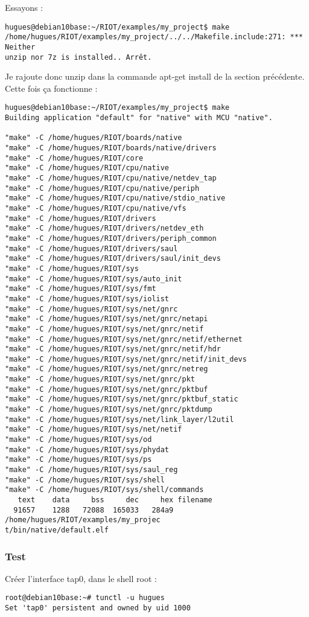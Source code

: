 Essayons :
\begin{verbatim}
hugues@debian10base:~/RIOT/examples/my_project$ make
/home/hugues/RIOT/examples/my_project/../../Makefile.include:271: *** Neither
unzip nor 7z is installed.. Arrêt.
\end{verbatim}
Je rajoute donc unzip dans la commande apt-get install de la section précédente.\\

Cette fois ça fonctionne :
\begin{verbatim}
hugues@debian10base:~/RIOT/examples/my_project$ make
Building application "default" for "native" with MCU "native".

"make" -C /home/hugues/RIOT/boards/native
"make" -C /home/hugues/RIOT/boards/native/drivers
"make" -C /home/hugues/RIOT/core
"make" -C /home/hugues/RIOT/cpu/native
"make" -C /home/hugues/RIOT/cpu/native/netdev_tap
"make" -C /home/hugues/RIOT/cpu/native/periph
"make" -C /home/hugues/RIOT/cpu/native/stdio_native
"make" -C /home/hugues/RIOT/cpu/native/vfs
"make" -C /home/hugues/RIOT/drivers
"make" -C /home/hugues/RIOT/drivers/netdev_eth
"make" -C /home/hugues/RIOT/drivers/periph_common
"make" -C /home/hugues/RIOT/drivers/saul
"make" -C /home/hugues/RIOT/drivers/saul/init_devs
"make" -C /home/hugues/RIOT/sys
"make" -C /home/hugues/RIOT/sys/auto_init
"make" -C /home/hugues/RIOT/sys/fmt
"make" -C /home/hugues/RIOT/sys/iolist
"make" -C /home/hugues/RIOT/sys/net/gnrc
"make" -C /home/hugues/RIOT/sys/net/gnrc/netapi
"make" -C /home/hugues/RIOT/sys/net/gnrc/netif
"make" -C /home/hugues/RIOT/sys/net/gnrc/netif/ethernet
"make" -C /home/hugues/RIOT/sys/net/gnrc/netif/hdr
"make" -C /home/hugues/RIOT/sys/net/gnrc/netif/init_devs
"make" -C /home/hugues/RIOT/sys/net/gnrc/netreg
"make" -C /home/hugues/RIOT/sys/net/gnrc/pkt
"make" -C /home/hugues/RIOT/sys/net/gnrc/pktbuf
"make" -C /home/hugues/RIOT/sys/net/gnrc/pktbuf_static
"make" -C /home/hugues/RIOT/sys/net/gnrc/pktdump
"make" -C /home/hugues/RIOT/sys/net/link_layer/l2util
"make" -C /home/hugues/RIOT/sys/net/netif
"make" -C /home/hugues/RIOT/sys/od
"make" -C /home/hugues/RIOT/sys/phydat
"make" -C /home/hugues/RIOT/sys/ps
"make" -C /home/hugues/RIOT/sys/saul_reg
"make" -C /home/hugues/RIOT/sys/shell
"make" -C /home/hugues/RIOT/sys/shell/commands
   text	   data	    bss	    dec	    hex	filename
  91657	   1288	  72088	 165033	  284a9	/home/hugues/RIOT/examples/my_projec
t/bin/native/default.elf
\end{verbatim}

\subsubsection{Test}
Créer l'interface tap0, dans le shell root :
\begin{verbatim}
root@debian10base:~# tunctl -u hugues
Set 'tap0' persistent and owned by uid 1000
\end{verbatim}

